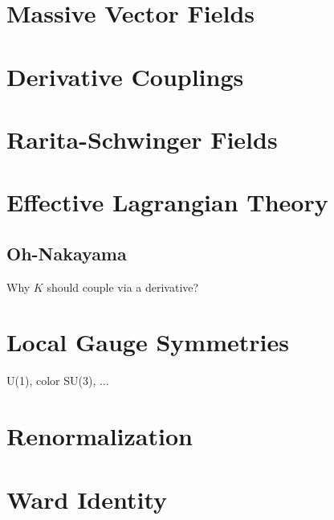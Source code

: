 \documentclass[12pt]{article}
\newcommand{\srcseventeen}[0]{myqft/versions/2017}
\begin{document}
\newpage
\section{Massive Vector  Fields}


\newpage
\section{Derivative Couplings}


\newpage
\section{Rarita-Schwinger Fields}

\section{Effective Lagrangian Theory}
\subsection{Oh-Nakayama}
Why $K$ should couple via a derivative?
\section{Local Gauge Symmetries}
U(1), color SU(3), ...\\

\section{Renormalization}
\section{Ward Identity}


\begin{comment}
\newpage
\setcounter{section}{10}
\section{interference terms}
\section{$\gamma p \rightarrow \phi X$}
\section{Sasha PRC72}
\section{$\gamma p \rightarrow K \Lambda$}
\end{comment}
\end{document}
